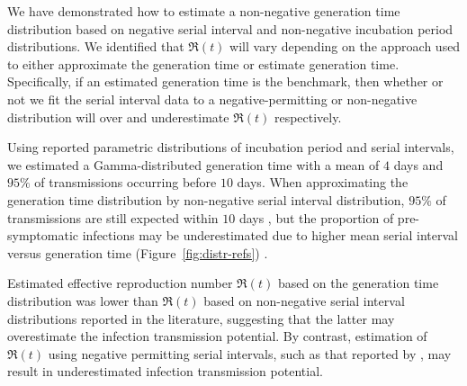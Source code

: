 
We have demonstrated how to estimate  %
a non-negative generation time distribution
based on negative serial interval
and non-negative incubation period distributions. %
We identified that $\Re(t)$ will vary depending on 
the approach used to either approximate the generation time 
or estimate generation time. Specifically, if an
estimated generation time is the benchmark, then
whether or not we fit the serial interval data to 
a negative-permitting or non-negative distribution will
over and underestimate $\Re(t)$ respectively.  %

\par
Using reported parametric \covid distributions of incubation period and serial intervals,
we estimated a Gamma-distributed generation time
with a mean of $4$ days and                                     %
$95\%$ of transmissions occurring before $10$ days. %
When approximating the generation time distribution   %
by non-negative serial interval distribution,
$95\%$ of transmissions are still expected within $10$ days
\cite{Zhang2020,Nishiura2020},
but the proportion of pre-symptomatic infections may be underestimated  %
due to higher mean serial interval versus generation time
(Figure~\ref{fig:distr-refs}) \cite{Ganyani2020,Tindale2020}.

\par %
Estimated effective reproduction number $\Re(t)$
based on the generation time distribution
was lower than $\Re(t)$ based on
non-negative serial interval distributions reported in the literature,  %
suggesting that the latter may overestimate
the infection transmission potential.
By contrast, estimation of $\Re(t)$ using
negative permitting serial intervals,
such as that reported by \textcite{Du2020},
may result in underestimated infection transmission potential.

